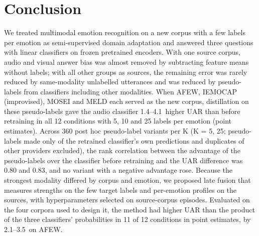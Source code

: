 \section{Conclusion}\label{sec:conclusion}

We treated multimodal emotion recognition on a new corpus with a few labels per emotion as semi-supervised domain adaptation and answered three questions with linear classifiers on frozen pretrained encoders. With one source corpus, audio and visual answer bias was almost removed by subtracting feature means without labels; with all other groups as sources, the remaining error was rarely reduced by same-modality unlabelled utterances and was reduced by pseudo-labels from classifiers including other modalities. When AFEW, IEMOCAP (improvised), MOSEI and MELD each served as the new corpus, distillation on these pseudo-labels gave the audio classifier 1.4--4.1\pt\ higher UAR than before retraining in all 12 conditions with 5, 10 and 25 labels per emotion (point estimates). Across 360 post hoc pseudo-label variants per K (K = 5, 25; pseudo-labels made only of the retrained classifier's own predictions and duplicates of other providers excluded), the rank correlation between the advantage of the pseudo-labels over the classifier before retraining and the UAR difference was 0.80 and 0.83, and no variant with a negative advantage rose. Because the strongest modality differed by corpus and emotion, we proposed late fusion that measures strengths on the few target labels and per-emotion profiles on the sources, with hyperparameters selected on source-corpus episodes. Evaluated on the four corpora used to design it, the method had higher UAR than the product of the three classifiers' probabilities in 11 of 12 conditions in point estimates, by 2.1--3.5\pt\ on AFEW.

